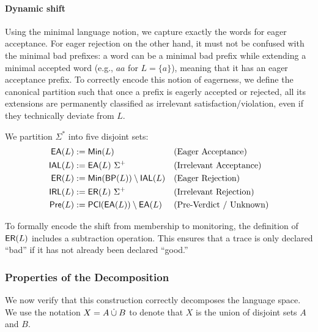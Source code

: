 \paragraph{Dynamic shift} Using the minimal language notion, we capture exactly the words for eager acceptance. For eager rejection on the other hand, it must not be confused with the minimal bad prefixes: a word can be a minimal bad prefix while extending a minimal accepted word (e.g., $aa$ for $L=\{a\}$), meaning that it has an eager acceptance prefix. To correctly encode this notion of eagerness, we define the canonical partition such that once a prefix is eagerly accepted or rejected, all its extensions are permanently classified as irrelevant satisfaction/violation, even if they technically deviate from $L$.

\begin{definition}\label{def:partition-sets}
    We partition $\Sigma^*$ into five disjoint sets:
    \begin{align*}
        \EAL{L} &:= \minlang{L}                                  && \text{(Eager Acceptance)} \\
        \IAL{L} &:= \EAL{L}\,\Sigma^{+}                          && \text{(Irrelevant Acceptance)} \\
        \ERL{L} &:= \minlang{\badclass{L}} \setminus \IAL{L}     && \text{(Eager Rejection)} \\
        \IRL{L} &:= \ERL{L}\,\Sigma^{+}                          && \text{(Irrelevant Rejection)} \\
        \Pre{L} &:= \closureclass{\EAL{L}} \setminus \EAL{L}     && \text{(Pre-Verdict / Unknown)}
    \end{align*}
\end{definition}

To formally encode the shift from membership to monitoring, the definition of $\mathsf{ER}\!\left(L\right)$ includes a subtraction operation. This ensures that a trace is only declared ``bad'' if it has not already been declared ``good.''

\subsubsection{Properties of the Decomposition}

We now verify that this construction correctly decomposes the language space. We use the notation $X = A \mathbin{\dot\cup} B$ to denote that $X$ is the union of disjoint sets $A$ and $B$.

